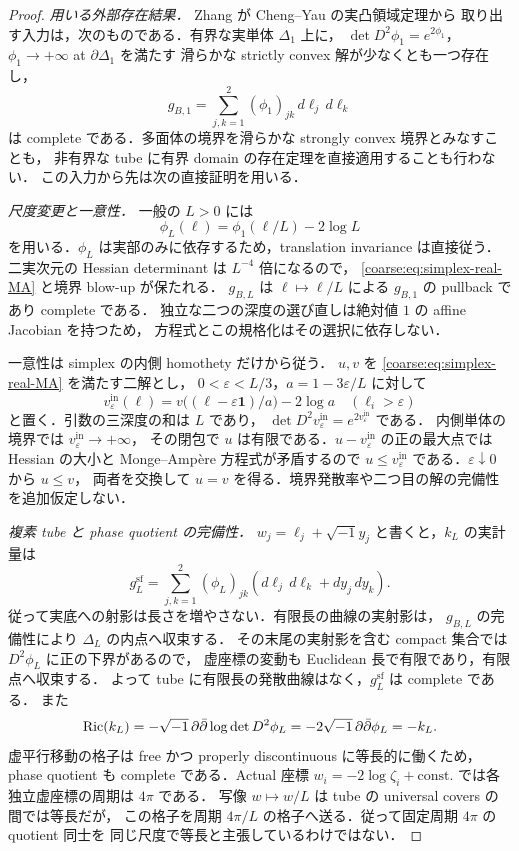 \begin{proof}
\emph{用いる外部存在結果．}
Zhang\cite[Theorem~2.1]{ZhangNegativeKE} が Cheng--Yau の実凸領域定理から
取り出す入力は，次のものである．有界な実単体 $\Delta_1$ 上に，
$\det D^2\phi_1=e^{2\phi_1}$，$\phi_1\to+\infty$ at $\partial\Delta_1$ を満たす
滑らかな strictly convex 解が少なくとも一つ存在し，
\[
 g_{B,1}=\sum_{j,k=1}^2(\phi_1)_{jk}\,d\ell_j\,d\ell_k
\]
は complete である．多面体の境界を滑らかな strongly convex 境界とみなすことも，
非有界な tube に有界 domain の存在定理を直接適用することも行わない．
この入力から先は次の直接証明を用いる．

\emph{尺度変更と一意性．}
一般の $L>0$ には
\begin{equation}\label{coarse:eq:simplex-scaling}
 \phi_L(\ell)=\phi_1(\ell/L)-2\log L
\end{equation}
を用いる．$\phi_L$ は実部のみに依存するため，translation invariance は直接従う．
二実次元の Hessian determinant は $L^{-4}$ 倍になるので，
\eqref{coarse:eq:simplex-real-MA} と境界 blow-up が保たれる．
$g_{B,L}$ は $\ell\mapsto\ell/L$ による $g_{B,1}$ の pullback であり complete である．
独立な二つの深度の選び直しは絶対値 $1$ の affine Jacobian を持つため，
方程式とこの規格化はその選択に依存しない．

一意性は simplex の内側 homothety だけから従う．
$u,v$ を \eqref{coarse:eq:simplex-real-MA} を満たす二解とし，
$0<\varepsilon<L/3$，$a=1-3\varepsilon/L$ に対して
\[
 v_\varepsilon^{\mathrm{in}}(\ell)
 =v\bigl((\ell-\varepsilon\mathbf1)/a\bigr)-2\log a
 \quad(\ell_i>\varepsilon)
\]
と置く．引数の三深度の和は $L$ であり，
$\det D^2v_\varepsilon^{\mathrm{in}}=e^{2v_\varepsilon^{\mathrm{in}}}$ である．
内側単体の境界では $v_\varepsilon^{\mathrm{in}}\to+\infty$，
その閉包で $u$ は有限である．$u-v_\varepsilon^{\mathrm{in}}$ の正の最大点では
Hessian の大小と Monge--Amp\`ere 方程式が矛盾するので
$u\le v_\varepsilon^{\mathrm{in}}$ である．$\varepsilon\downarrow0$ から $u\le v$，
両者を交換して $u=v$ を得る．境界発散率や二つ目の解の完備性を追加仮定しない．

\emph{複素 tube と phase quotient の完備性．}
$w_j=\ell_j+\sqrt{-1}y_j$ と書くと，$k_L$ の実計量は
\begin{equation}\label{coarse:eq:simplex-real-block-metric}
 g_L^{\mathrm{sf}}
 =\sum_{j,k=1}^2(\phi_L)_{jk}
       (d\ell_j\,d\ell_k+dy_j\,dy_k).
\end{equation}
従って実底への射影は長さを増やさない．有限長の曲線の実射影は，
$g_{B,L}$ の完備性により $\Delta_L$ の内点へ収束する．
その末尾の実射影を含む compact 集合では $D^2\phi_L$ に正の下界があるので，
虚座標の変動も Euclidean 長で有限であり，有限点へ収束する．
よって tube に有限長の発散曲線はなく，$g_L^{\mathrm{sf}}$ は complete である．
また
\[
 \operatorname{Ric}(k_L)=-\sqrt{-1}\,\partial\bar\partial\log\det D^2\phi_L=-2\sqrt{-1}\,\partial\bar\partial\phi_L=-k_L.
\]
虚平行移動の格子は free かつ properly discontinuous に等長的に働くため，
phase quotient も complete である．Actual 座標 $w_i=-2\log\zeta_i+\mathrm{const.}$
では各独立虚座標の周期は $4\pi$ である．
写像 $w\mapsto w/L$ は tube の universal covers の間では等長だが，
この格子を周期 $4\pi/L$ の格子へ送る．従って固定周期 $4\pi$ の quotient 同士を
同じ尺度で等長と主張しているわけではない．


\end{proof}
